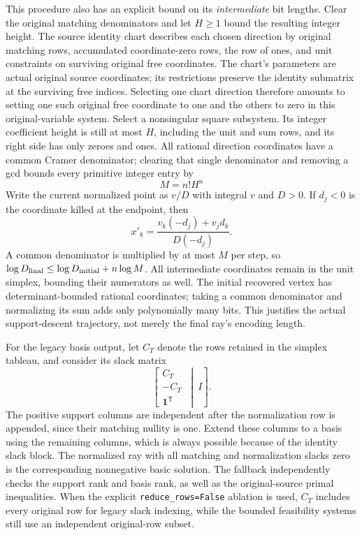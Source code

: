 This procedure also has an explicit bound on its \emph{intermediate} bit
lengths.  Clear the original matching denominators and let $H\ge1$ bound
the resulting integer height.  The source identity chart describes each
chosen direction by original matching rows, accumulated coordinate-zero
rows, the row of ones, and unit constraints on surviving original free
coordinates.  The chart's parameters are actual original source coordinates;
its restrictions preserve the identity submatrix at the surviving free
indices.  Selecting one chart direction therefore amounts to setting one
such original free coordinate to one and the others to zero in this
original-variable system.  Select a nonsingular square subsystem.  Its
integer coefficient height is still at most $H$, including the unit and
sum rows, and its right side has only zeroes and ones.  All rational
direction coordinates have a common Cramer denominator; clearing that
single denominator and removing a gcd bounds every primitive integer
entry by
\[
 M=n!H^n
\]
Write the current normalized point as $v/D$ with integral
$v$ and $D>0$.  If $d_j<0$ is the coordinate killed at the endpoint, then
\[
 x'_k=\frac{v_k(-d_j)+v_jd_k}{D(-d_j)}.
\]
A common denominator is multiplied by at most $M$ per step, so
$\log D_{\rm final}\le\log D_{\rm initial}+n\log M$.
All intermediate coordinates remain in the unit simplex, bounding their
numerators as well.  The initial recovered vertex has determinant-bounded
rational coordinates; taking a common denominator and normalizing its sum
adds only polynomially many bits.  This justifies the actual support-descent
trajectory, not merely the final ray's encoding length.

For the legacy basis output, let $C_T$ denote the rows retained in the
simplex tableau, and consider its slack matrix
\[
 \left[\begin{array}{c} C_T\\-C_T\\\mathbf1^{\mathsf T}\end{array}
 \ \middle|\ I\right].
\]
The positive support columns are independent after the normalization row
is appended, since their matching nullity is one.  Extend these columns
to a basis using the remaining columns, which is always possible because
of the identity slack block.  The normalized ray with all matching and
normalization slacks zero is the corresponding nonnegative basic solution.
The fallback independently checks the support rank and basis rank, as well
as the original-source primal inequalities.  When the explicit
\texttt{reduce\_rows=False} ablation is used, $C_T$ includes every original
row for legacy slack indexing, while the bounded feasibility systems still
use an independent original-row subset.

